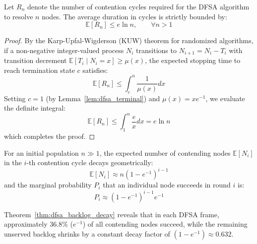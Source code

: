 \begin{theorem}
\label{thm:dfsa_Rn_bound}
Let $R_n$ denote the number of contention cycles required for the DFSA algorithm to resolve $n$ nodes. The average duration in cycles is strictly bounded by:
\begin{equation}
    \label{eq:Rn_upper_bound}
    \mathbb{E}[R_n] \le e \ln n, \qquad \forall n > 1
\end{equation}
\end{theorem}
\begin{proof}
By the Karp-Upfal-Wigderson (KUW) theorem for randomized algorithms, if a non-negative integer-valued process $N_i$ transitions to $N_{i+1} = N_i - T_i$ with transition decrement $\mathbb{E}[T_i \mid N_i = x] \ge \mu(x)$, the expected stopping time to reach termination state $c$ satisfies:
\begin{equation}
    \mathbb{E}[R_n] \le \int_c^n \frac{1}{\mu(x)} dx
\end{equation}
Setting $c = 1$ (by Lemma~\ref{lem:dfsa_terminal}) and $\mu(x) = x e^{-1}$, we evaluate the definite integral:
\begin{equation}
    \mathbb{E}[R_n] \le \int_1^n \frac{e}{x} dx = e \ln n
\end{equation}
which completes the proof.
\end{proof}

\begin{theorem}
\label{thm:dfsa_backlog_decay}
For an initial population $n \gg 1$, the expected number of contending nodes $\mathbb{E}[N_i]$ in the $i$-th contention cycle decays geometrically:
\begin{equation}
    \label{eq:Ni_decay}
    \mathbb{E}[N_i] \approx n \left( 1 - e^{-1} \right)^{i - 1}
\end{equation}
and the marginal probability $P_i$ that an individual node succeeds in round $i$ is:
\begin{equation}
    \label{eq:Pi_prob}
    P_i \approx \left( 1 - e^{-1} \right)^{i - 1} e^{-1}
\end{equation}
\end{theorem}

Theorem~\ref{thm:dfsa_backlog_decay} reveals that in each DFSA frame, approximately $36.8\%$ ($e^{-1}$) of all contending nodes succeed, while the remaining unserved backlog shrinks by a constant decay factor of $(1 - e^{-1}) \approx 0.632$.

